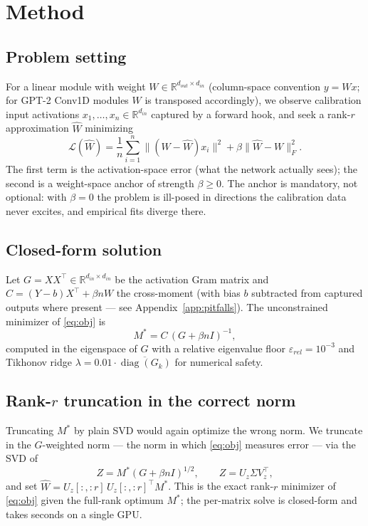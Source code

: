 \documentclass[11pt]{article}
\newcommand{\Wh}{\widehat{W}}
\begin{document}
\section{Method}\label{sec:method}

\subsection{Problem setting}
For a linear module with weight $W \in \mathbb{R}^{d_{out}\times d_{in}}$
(column-space convention $y = Wx$; for GPT-2 Conv1D modules $W$ is
transposed accordingly), we observe calibration input activations
$x_1,\dots,x_n \in \mathbb{R}^{d_{in}}$ captured by a forward hook, and
seek a rank-$r$ approximation $\Wh$ minimizing
\begin{equation}\label{eq:obj}
  \mathcal{L}(\Wh) = \frac{1}{n}\sum_{i=1}^{n} \|(W-\Wh)x_i\|^2
                     + \beta \|\Wh - W\|_F^2 .
\end{equation}
The first term is the activation-space error (what the network actually
sees); the second is a weight-space anchor of strength $\beta \ge 0$. The
anchor is mandatory, not optional: with $\beta = 0$ the problem is
ill-posed in directions the calibration data never excites, and empirical
fits diverge there.

\subsection{Closed-form solution}
Let $G = XX^\top \in \mathbb{R}^{d_{in}\times d_{in}}$ be the activation
Gram matrix and $C = (Y-b)X^\top + \beta n W$ the cross-moment (with bias
$b$ subtracted from captured outputs where present --- see
Appendix~\ref{app:pitfalls}). The unconstrained minimizer of
\eqref{eq:obj} is
\begin{equation}\label{eq:mstar}
  M^{*} = C\,(G + \beta n I)^{-1},
\end{equation}
computed in the eigenspace of $G$ with a relative eigenvalue floor
$\varepsilon_{rel} = 10^{-3}$ and Tikhonov ridge
$\lambda = 0.01 \cdot \overline{\operatorname{diag}(G_k)}$ for numerical
safety.

\subsection{Rank-$r$ truncation in the correct norm}
Truncating $M^{*}$ by plain SVD would again optimize the wrong norm. We
truncate in the $G$-weighted norm --- the norm in which \eqref{eq:obj}
measures error --- via the SVD of
\begin{equation}\label{eq:trunc}
  Z = M^{*}(G+\beta n I)^{1/2}, \qquad Z = U_z \Sigma V_z^\top,
\end{equation}
and set $\Wh = U_z[:,{:}r]\, U_z[:,{:}r]^\top M^{*}$. This is the exact
rank-$r$ minimizer of \eqref{eq:obj} given the full-rank optimum $M^{*}$;
the per-matrix solve is closed-form and takes seconds on a single GPU.
\end{document}
